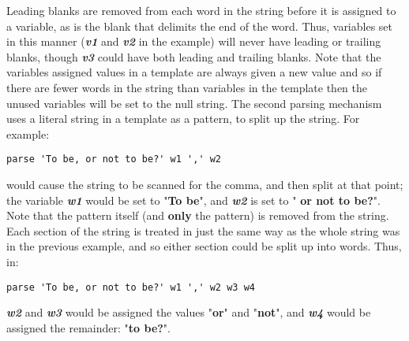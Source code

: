Leading blanks are removed from each word in the string before it is
assigned to a variable, as is the blank that delimits the end of the
word.
Thus, variables set in this manner (\textbf{\emph{v1}}
and \textbf{\emph{v2}} in the example) will never have leading or
trailing blanks, though \textbf{\emph{v3}} could have both leading
and trailing blanks.
 Note that the variables assigned values in a template are always
given a new value and so if there are fewer words in the string than
variables in the template then the unused variables will be set to the
null string.
 The second parsing mechanism uses a literal string in a template as a
pattern, to split up the string.
For example:
\begin{lstlisting}
parse 'To be, or not to be?' w1 ',' w2
\end{lstlisting}
would cause the string to be scanned for the comma, and then split
at that point; the variable \textbf{\emph{w1}} would be set
to "\textbf{To be}", and \textbf{\emph{w2}} is set to
"\textbf{ or not to be?}".
Note that the pattern itself (and \textbf{only} the pattern) is
removed from the string.
Each section of the string is treated in just the same way as the whole
string was in the previous example, and so either section could be split
up into words.
 Thus, in:
\begin{lstlisting}
parse 'To be, or not to be?' w1 ',' w2 w3 w4
\end{lstlisting}
\textbf{\emph{w2}} and \textbf{\emph{w3}} would be
assigned the values "\textbf{or}" and "\textbf{not}",
and \textbf{\emph{w4}} would be assigned the remainder:
"\textbf{to be?}".
 
